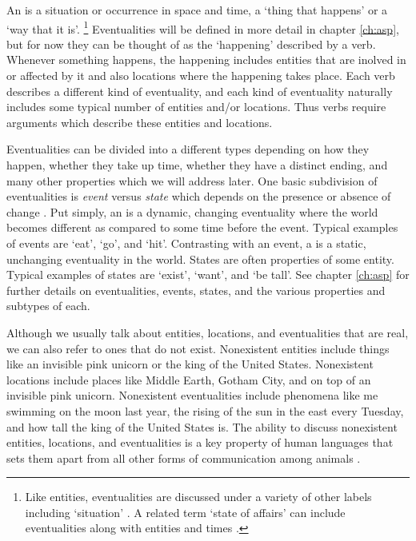 An  is a situation or occurrence in space and time, a ‘thing that happens’ or a ‘way that it is’.%
\footnote{Like entities, eventualities are discussed under a variety of other labels including ‘situation’ \parencites{binnick:1991}{smith:1997}{kratzer:2019}. A related term ‘state of affairs’ can include eventualities along with entities and times \parencites{binnick:1991}{textor:2016}{kratzer:2019}.}
Eventualities will be defined in more detail in chapter \ref{ch:asp}, but for now they can be thought of as the ‘happening’ described by a verb.
Whenever something happens, the happening includes entities that are inolved in or affected by it and also locations where the happening takes place.
Each verb describes a different kind of eventuality, and each kind of eventuality naturally includes some typical number of entities and/or locations. Thus verbs require arguments which describe these entities and locations.

Eventualities can be divided into a different types depending on how they happen, whether they take up time, whether they have a distinct ending, and many other properties which we will address later.
One basic subdivision of eventualities is \emph{event} versus \emph{state} which depends on the presence or absence of change \parencites{bach:1986}{higginbotham:2000}{maienborn:2011}{zucchi:2015}.
Put simply, an  is a dynamic, changing eventuality where the world becomes different as compared to some time before the event. Typical examples of events are ‘eat’, ‘go’, and ‘hit’.
Contrasting with an event, a  is a static, unchanging eventuality in the world.
States are often properties of some entity.
Typical examples of states are ‘exist’, ‘want’, and ‘be tall’.  See chapter \ref{ch:asp} for further details on eventualities, events, states, and the various properties and subtypes of each.

Although we usually talk about entities, locations, and eventualities that are real, we can also refer to ones that do not exist.
Nonexistent entities include things like an invisible pink unicorn or the king of the United States.
Nonexistent locations include places like Middle Earth, Gotham City, and on top of an invisible pink unicorn.
Nonexistent eventualities include phenomena like me swimming on the moon last year, the rising of the sun in the east every Tuesday, and how tall the king of the United States is.
The ability to discuss nonexistent entities, locations, and eventualities is a key property of human languages that sets them apart from all other forms of communication among animals \parencite{hockett:1960}.

